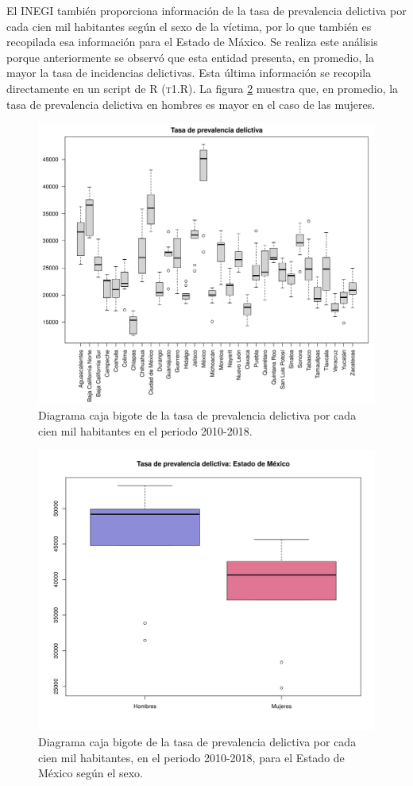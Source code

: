 \documentclass[12pt]{article}
\begin{document}
El INEGI también proporciona información de la tasa de prevalencia delictiva por cada cien mil habitantes según el sexo de la víctima, por lo que también es recopilada esa información para el Estado de Máxico. Se realiza este análisis porque anteriormente se observó que esta entidad presenta, en promedio, la mayor la tasa de incidencias delictivas. Esta última información se recopila directamente en un script de \textsc{R} (\textsc{t1.R}). La figura \ref{vic.edomex} muestra que, en promedio, la tasa de prevalencia delictiva en hombres es mayor en el caso de las mujeres. 


\begin{figure}
	\centering
	\includegraphics[scale=0.5]{victimizacion.png}
	\caption{Diagrama caja bigote de la tasa de prevalencia delictiva por cada cien mil habitantes en el periodo 2010-2018.}
	\label{vic}
\end{figure}

\begin{figure}
	\centering
	\includegraphics[scale=0.5]{edomex.png}
	\caption{Diagrama caja bigote de la tasa de prevalencia delictiva por cada cien mil habitantes, en el periodo 2010-2018, para el Estado de México según el sexo.}
	\label{vic.edomex}
\end{figure}

\nocite{*}


\end{document}
